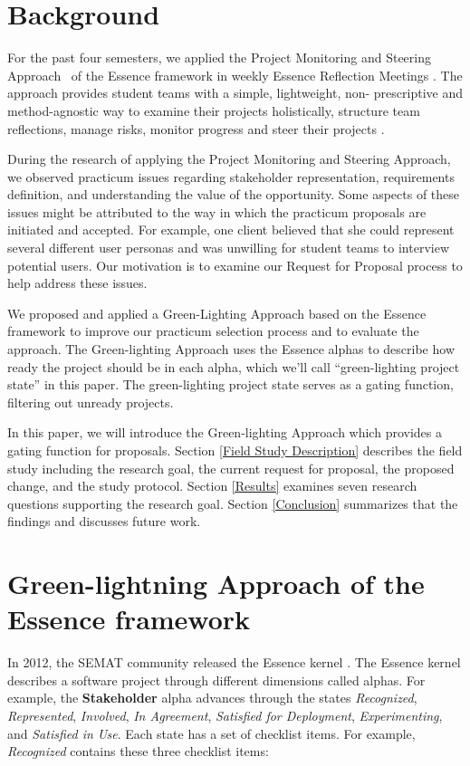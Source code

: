 \documentclass[conference]{IEEEtran}
\begin{document}
\section{Background}
\label{Background}
For the past four semesters, we applied the Project Monitoring and
Steering Approach ~of the Essence framework
\cite{EssenceBook} in weekly Essence Reflection
Meetings \cite{EASE2014}. The approach provides student
teams with a simple, lightweight, non- prescriptive and method-agnostic
way to examine their projects holistically, structure team reflections,
manage risks, monitor progress and steer their projects
\cite{ICSE2014}.

During the research of applying the Project Monitoring and Steering
Approach, we observed practicum issues regarding stakeholder
representation, requirements definition, and understanding the value of
the opportunity. Some aspects of these issues might be attributed to
the way in which the practicum proposals are initiated and
accepted. For example, one client believed that she could represent several different user personas and was unwilling for student teams to interview potential users. Our motivation is to examine our Request for Proposal
process to help address these issues.

We proposed and applied a Green-Lighting Approach based on the Essence
framework \cite{EssenceBook} to improve our practicum selection
process and to evaluate the approach. The Green-lighting Approach
uses the Essence alphas to describe how ready the project should be in
each alpha, which we'll call ``green-lighting project state'' in this
paper. The green-lighting project state serves as a gating function,
filtering out unready projects.

In this paper, we will introduce the Green-lighting Approach which
provides a gating function for proposals. Section
\ref{Field Study Description} describes the field study
including the research goal, the current request for proposal, the
proposed change, and the study protocol. Section
\ref{Results} examines seven research questions
supporting the research goal. Section \ref{Conclusion}
summarizes that the findings and discusses future work.


\section{Green-lightning Approach of the Essence framework}
\label{Green-lightning Approach of the Essence framework}

In 2012, the SEMAT community released the Essence kernel
\cite{OMGStandard}. The Essence kernel describes a
software project through different dimensions called alphas. For
example, the \textbf{Stakeholder} alpha advances through the states
\textit{Recognized}, \textit{Represented}, \textit{Involved}, 
\textit{In Agreement}, \textit{Satisfied for Deployment}, \textit{Experimenting}, and \textit{Satisfied in Use}. Each state has a set of checklist items. For example, \textit{Recognized} contains these three checklist items:
\end{document}
